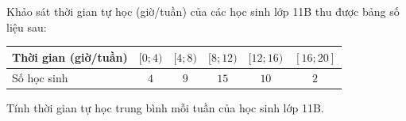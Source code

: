 \begin{ex}
Khảo sát thời gian tự học (giờ/tuần) của các học sinh lớp 11B thu được bảng số liệu sau:
\begin{center}\begin{tabular}{|l|c|c|c|c|c|}\hline
Thời gian (giờ/tuần) & $[0;4)$ & $[4;8)$ & $[8;12)$ & $[12;16)$ & $[16;20]$\\\hline
Số học sinh & $4$ & $9$ & $15$ & $10$ & $2$\\\hline
\end{tabular}\end{center}
Tính thời gian tự học trung bình mỗi tuần của học sinh lớp 11B.
\end{ex}

